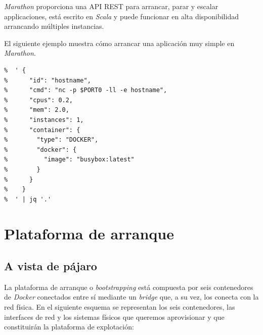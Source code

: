 \documentclass[a4paper,12pt,spanish,final]{epsc_tfc_pfc}
\begin{document}
\emph{Marathon} proporciona una API REST para arrancar, parar y escalar applicaciones, está escrito en \emph{Scala} y puede funcionar en alta disponibilidad arrancando múltiples instancias.

El siguiente ejemplo muestra cómo arrancar una aplicación muy simple en \emph{Marathon}.\\

\begin{lstlisting}[style=dnsmasq]
%curl -s -H "Content-Type: application/json" http://core01:8080/v2/apps -d \
%  ' {
%      "id": "hostname",
%      "cmd": "nc -p $PORT0 -ll -e hostname",
%      "cpus": 0.2,
%      "mem": 2.0,
%      "instances": 1,
%      "container": {
%        "type": "DOCKER",
%        "docker": {
%          "image": "busybox:latest"
%        }
%      }
%    }
%  ' | jq '.'
\end{lstlisting}


\chapter{Plataforma de arranque}

\section{A vista de pájaro}

La plataforma de arranque o \emph{bootstrapping} está compuesta por seis contenedores de \emph{Docker} conectados entre sí mediante un \emph{bridge} que, a su vez, los conecta con la red física. En el siguiente esquema se representan los seis contenedores, las interfaces de red y los sistemas físicos que queremos aprovisionar y que constituirán la plataforma de explotación:
\end{document}
